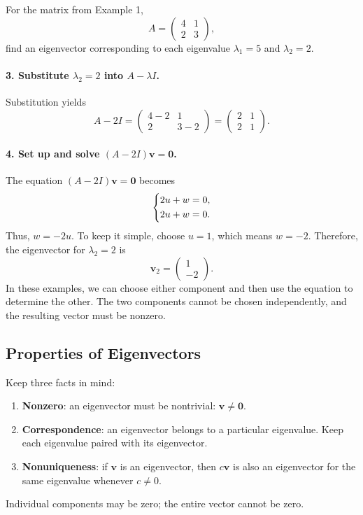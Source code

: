 \documentclass[10pt,letterpaper]{article}
\begin{document}
\begin{example}[3]{
For the matrix from Example 1,
\[
A=
\begin{pmatrix}
4&1\\
2&3
\end{pmatrix},
\]
find an eigenvector corresponding to each eigenvalue
$\lambda_1=5$ and $\lambda_2=2$.
}
\paragraph{3. Substitute $\lambda_2=2$ into $A-\lambda I$.}
Substitution yields 
\[
A-2I=\begin{pmatrix}
    4-2& 1 \\
    2 & 3-2
\end{pmatrix}=
\begin{pmatrix}
2&1\\
2&1
\end{pmatrix}.
\]
\paragraph{4. Set up and solve $(A-2 I)\textbf{v}=\textbf{0}$.}
The equation $(A-2I)\mathbf{v}=\mathbf{0}$ becomes
\[
\begin{dcases}
2u+w=0,\\
2u+w=0.
\end{dcases}
\]
Thus, $w=-2u$. To keep it simple, choose $u=1$, which means $w=-2$. Therefore, the eigenvector for $\lambda_2=2$ is 
\[
\boxed{
\mathbf{v}_2=\begin{pmatrix}1\\-2\end{pmatrix}.
}
\]
In these examples, we can choose either component and then use the equation to determine the other. The two components cannot be chosen independently, and the resulting vector must be nonzero.
\end{example}

\subsection{Properties of Eigenvectors}

Keep three facts in mind:
\begin{enumerate}
    \item \textbf{Nonzero}: an eigenvector must be nontrivial: $\mathbf{v}\ne\mathbf{0}$.

    \item \textbf{Correspondence}: an eigenvector belongs
    to a particular eigenvalue. Keep each eigenvalue
    paired with its eigenvector.

    \item \textbf{Nonuniqueness}: if $\mathbf{v}$ is an
    eigenvector, then $c\mathbf{v}$ is also an eigenvector
    for the same eigenvalue whenever $c\ne0$.
\end{enumerate}
Individual components may be zero; the entire vector
cannot be zero.
\end{document}
